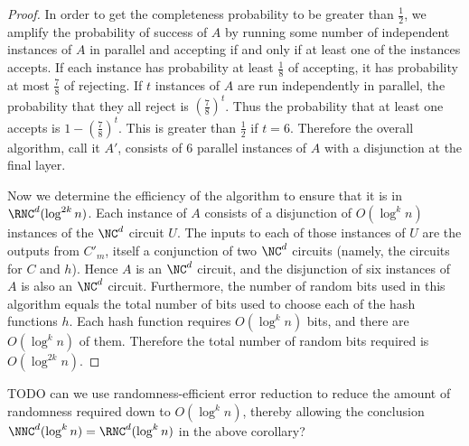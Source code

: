\documentclass{article}
\begin{document}
\begin{proof}
  In order to get the completeness probability to be greater than $\frac{1}{2}$, we amplify the probability of success of $A$ by running some number of independent instances of $A$ in parallel and accepting if and only if at least one of the instances accepts.
  If each instance has probability at least $\frac{1}{8}$ of accepting, it has probability at most $\frac{7}{8}$ of rejecting.
  If $t$ instances of $A$ are run independently in parallel, the probability that they all reject is $(\frac{7}{8})^t$.
  Thus the probability that at least one accepts is $1 - (\frac{7}{8})^t$.
  This is greater than $\frac{1}{2}$ if $t = 6$.
  Therefore the overall algorithm, call it $A'$, consists of 6 parallel instances of $A$ with a disjunction at the final layer.

  Now we determine the efficiency of the algorithm to ensure that it is in $\RNC^d(\log^{2k} n)$.
  Each instance of $A$ consists of a disjunction of $O(\log^k n)$ instances of the $\NC^d$ circuit $U$.
  The inputs to each of those instances of $U$ are the outputs from $C'_m$, itself a conjunction of two $\NC^d$ circuits (namely, the circuits for $C$ and $h$).
  Hence $A$ is an $\NC^d$ circuit, and the disjunction of six instances of $A$ is also an $\NC^d$ circuit.
  Furthermore, the number of random bits used in this algorithm equals the total number of bits used to choose each of the hash functions $h$.
  Each hash function requires $O(\log^k n)$ bits, and there are $O(\log^k n)$ of them.
  Therefore the total number of random bits required is $O(\log^{2k} n)$.
\end{proof}

TODO can we use randomness-efficient error reduction to reduce the amount of randomness required down to $O(\log^k n)$, thereby allowing the conclusion $\NNC^d(\log^k n) = \RNC^d(\log^k n)$ in the above corollary?



\end{document}
